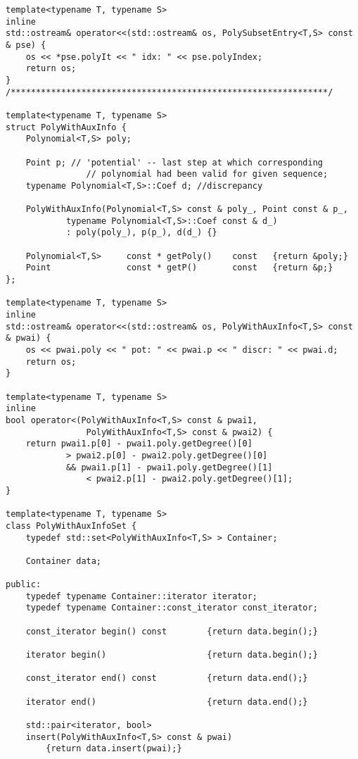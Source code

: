 \begin{lstlisting}
template<typename T, typename S>
inline
std::ostream& operator<<(std::ostream& os, PolySubsetEntry<T,S> const & pse) {
    os << *pse.polyIt << " idx: " << pse.polyIndex;
    return os;
}
/***************************************************************/

template<typename T, typename S>
struct PolyWithAuxInfo {
    Polynomial<T,S> poly;

    Point p; // 'potential' -- last step at which corresponding
                // polynomial had been valid for given sequence;
    typename Polynomial<T,S>::Coef d; //discrepancy

    PolyWithAuxInfo(Polynomial<T,S> const & poly_, Point const & p_,
            typename Polynomial<T,S>::Coef const & d_)
            : poly(poly_), p(p_), d(d_) {}

    Polynomial<T,S>     const * getPoly()    const   {return &poly;}
    Point               const * getP()       const   {return &p;}
};

template<typename T, typename S>
inline
std::ostream& operator<<(std::ostream& os, PolyWithAuxInfo<T,S> const & pwai) {
    os << pwai.poly << " pot: " << pwai.p << " discr: " << pwai.d;
    return os;
}

template<typename T, typename S>
inline
bool operator<(PolyWithAuxInfo<T,S> const & pwai1,
                PolyWithAuxInfo<T,S> const & pwai2) {
    return pwai1.p[0] - pwai1.poly.getDegree()[0]
            > pwai2.p[0] - pwai2.poly.getDegree()[0]
            && pwai1.p[1] - pwai1.poly.getDegree()[1]
                < pwai2.p[1] - pwai2.poly.getDegree()[1];
}

template<typename T, typename S>
class PolyWithAuxInfoSet {
    typedef std::set<PolyWithAuxInfo<T,S> > Container;

    Container data;

public:
    typedef typename Container::iterator iterator;
    typedef typename Container::const_iterator const_iterator;

    const_iterator begin() const        {return data.begin();}

    iterator begin()                    {return data.begin();}

    const_iterator end() const          {return data.end();}

    iterator end()                      {return data.end();}

    std::pair<iterator, bool> 
    insert(PolyWithAuxInfo<T,S> const & pwai) 
        {return data.insert(pwai);}


\end{lstlisting}

